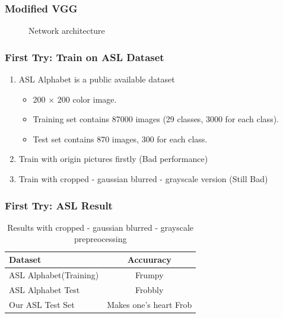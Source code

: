 \documentclass[handout]{beamer}
\begin{document}
\begin{frame}
\frametitle{Modified VGG}

\begin{figure}
\begin{center}
\fbox{\rule{0pt}{2in} \rule{.9\linewidth}{0pt}}
\end{center}
\caption{Network architecture}
\end{figure}

\end{frame}


\begin{frame}
\frametitle{First Try: Train on ASL Dataset}

\begin{enumerate}
	\item<+-| structure@+> ASL Alphabet is a public available dataset
	\begin{itemize}
		\item 200 $\times$ 200 color image.
		\item Training set contains 87000 images (29 classes, 3000 for each class).
		\item Test set contains 870 images, 300 for each class.
	\end{itemize}
	\item<+-| structure@+> Train with origin pictures firstly (Bad performance)
	\item<+-| structure@+> Train with cropped - gaussian blurred - grayscale version (Still Bad)
\end{enumerate}

\end{frame}

\begin{frame}
\frametitle{First Try: ASL Result}

\begin{table}[h]
\begin{center}
\begin{tabular}{|l|c|}
\hline
Dataset & Accuuracy \\
\hline\hline
ASL Alphabet(Training) & Frumpy \\
ASL Alphabet Test & Frobbly \\
Our ASL Test Set & Makes one's heart Frob\\
\hline
\end{tabular}
\end{center}
\caption{Results with cropped - gaussian blurred - grayscale prepreocessing}
\label{table:result}
\end{table}

\end{frame}
\end{document}

